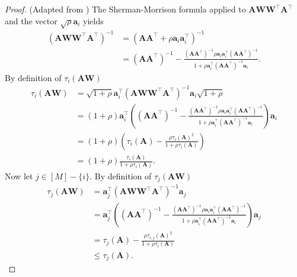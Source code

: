 \documentclass[twoside,11pt]{book}
\DeclareMathOperator{\Tran}{\intercal}
\begin{document}
\begin{proof}(Adapted from \cite{Coh15})
The Sherman-Morrison formula applied to $\bm{A}\bm{W}\bm{W}^{\Tran}\bm{A}^{\Tran}$ and the vector $\sqrt{\rho} \bm{a}_{i}$ yields
\begin{align}
(\bm{A}\bm{W}\bm{W}^{\Tran}\bm{A}^{\Tran})^{-1} &  = (\bm{A}\bm{A}^{\Tran} + \rho \bm{a}_{i}\bm{a}_{i}^{\Tran})^{-1} \\
& = (\bm{A}\bm{A}^{\Tran})^{-1} - \frac{(\bm{A}\bm{A}^{\Tran})^{-1}\rho \bm{a}_{i}\bm{a}_{i}^{\Tran} (\bm{A}\bm{A}^{\Tran})^{-1}}{1+ \rho \bm{a}_{i}^{\Tran}(\bm{A}\bm{A}^{\Tran})^{-1}\bm{a}_{i}}.
\end{align}
By definition of $\tau_{i}(\bm{A}\bm{W})$
\begin{align}
\tau_{i}(\bm{A}\bm{W}) & = \sqrt{1 + \rho} \bm{a}_{i}^{\Tran}(\bm{A}\bm{W}\bm{W}^{\Tran}\bm{A}^{\Tran})^{-1}\bm{a}_{i}\sqrt{1 + \rho}\\
& = (1+\rho)\bm{a}_{i}^{\Tran} \left( (\bm{A}\bm{A}^{\Tran})^{-1} - \frac{(\bm{A}\bm{A}^{\Tran})^{-1}\rho \bm{a}_{i}\bm{a}_{i}^{\Tran} (\bm{A}\bm{A}^{\Tran})^{-1}}{1+ \rho \bm{a}_{i}^{\Tran}(\bm{A}\bm{A}^{\Tran})^{-1}\bm{a}_{i}} \right) \bm{a}_{i} \nonumber\\
& = (1+\rho) \left(\tau_{i}(\bm{A}) - \frac{\rho \tau_{i}(\bm{A})^{2}}{1+\rho \tau_{i}(\bm{A})} \right) \nonumber\\
& = (1+\rho)\frac{\tau_{i}(\bm{A})}{1+\rho \tau_{i}(\bm{A})} \nonumber.
\end{align}
Now let $j \in [M]-\{i\}$. By definition of $\tau_{j}(\bm{A}\bm{W})$
\begin{align}
\tau_{j}(\bm{A}\bm{W}) & =  \bm{a}_{j}^{\Tran}(\bm{A}\bm{W}\bm{W}^{\Tran}\bm{A}^{\Tran})^{-1}\bm{a}_{j}\\
& = \bm{a}_{j}^{\Tran} \left( (\bm{A}\bm{A}^{\Tran})^{-1} - \frac{(\bm{A}\bm{A}^{\Tran})^{-1}\rho \bm{a}_{i}\bm{a}_{i}^{\Tran} (\bm{A}\bm{A}^{\Tran})^{-1}}{1+ \rho \bm{a}_{i}^{\Tran}(\bm{A}\bm{A}^{\Tran})^{-1}\bm{a}_{i}} \right) \bm{a}_{j} \nonumber\\
& =  \tau_{j}(\bm{A}) - \frac{\rho \tau_{i,j}(\bm{A})^{2}}{1+\rho \tau_{i}(\bm{A})} \nonumber\\
& \leq \tau_{j}(\bm{A}) \nonumber.
\end{align}
\end{proof}
\end{document}
